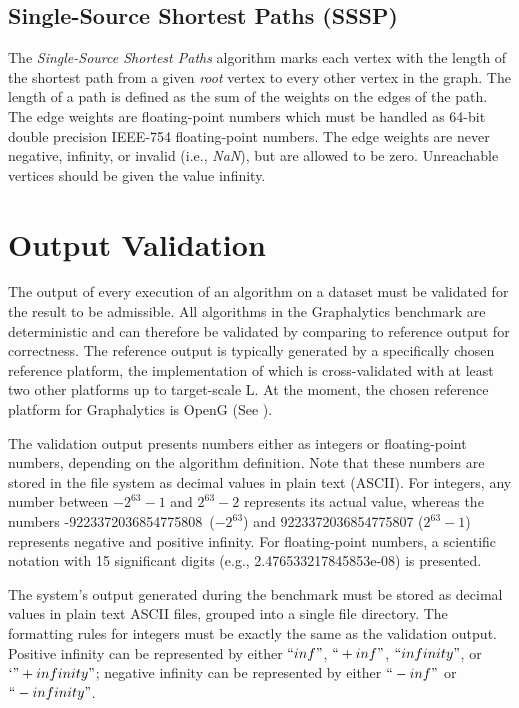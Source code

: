 \subsection{Single-Source Shortest Paths (SSSP)}
The \emph{Single-Source Shortest Paths} algorithm marks each vertex with the length of the shortest path from a given \emph{root} vertex to every other vertex in the graph. The length of a path is defined as the sum of the weights on the edges of the path. The edge weights are floating-point numbers which must be handled as 64-bit double precision IEEE-754 floating-point numbers. The edge weights are never negative, infinity, or invalid (i.e., \emph{NaN}), but are allowed to be zero. Unreachable vertices should be given the value infinity.






\section{Output Validation}
\label{sec:definitions_validation}

The output of every execution of an algorithm on a dataset must be validated for the result to be admissible. All algorithms in the Graphalytics benchmark are deterministic and can therefore be validated by comparing to reference output for correctness. The reference output is typically generated by a specifically chosen reference platform, the implementation of which is cross-validated with at least two other platforms up to target-scale L. At the moment, the chosen reference platform for Graphalytics is OpenG (See ).

The validation output presents numbers either as integers or floating-point numbers, depending on the algorithm definition. Note that these numbers are stored in the file system as decimal values in plain text (ASCII). For integers, any number between $-2^{63}-1$ and $2^{63}-2$ represents its actual value, whereas the numbers \mbox{-9223372036854775808 ($-2^{63}$)} and \mbox{9223372036854775807} ($2^{63}-1$) represents negative and positive infinity. For floating-point numbers, a scientific notation with 15 significant digits (e.g., 2.476533217845853e-08) is presented.

The system's output generated during the benchmark must be stored as decimal values in plain text ASCII files, grouped into a single file directory. The formatting rules for integers must be exactly the same as the validation output. Positive infinity can be represented by either $``inf"$, $``+inf"$, $``infinity"$, or $`"+infinity"$; negative infinity can be represented by either $``-inf"$ or $``-infinity"$. 

